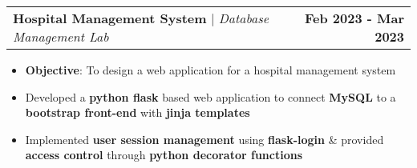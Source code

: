 \documentclass[letterpaper,9pt]{article}
\makeatletter
\newcommand{\resumeItem}[1]{
  \item\small{
    {#1 \vspace{-2pt}}
  }
}
\newcommand{\resumeItemNoBullet}[1]{
  \item[]\small{
    {#1 \vspace{-2pt}}
  }
}
\newcommand{\resumeProjectHeading}[2]{
    \item
    \begin{tabular*}{1.001\textwidth}{l@{\extracolsep{\fill}}r}
      \small#1 & \textbf{\small #2}\\
    \end{tabular*}\vspace{-7pt}
}
\newcommand{\resumeItemListStart}{\begin{itemize}}
\newcommand{\resumeItemListEnd}{\end{itemize}\vspace{-5pt}}
\makeatother
\begin{document}
      \resumeProjectHeading
        {\textbf{Hospital Management System} $|$ \emph{Database Management Lab}}{Feb 2023 - Mar 2023}
        \resumeItemListStart
          \resumeItemNoBullet{\textbf{Objective}: To design a web application for a hospital management system}
          \resumeItem{Developed a \textbf{python flask} based web application to connect \textbf{MySQL} to a \textbf{bootstrap front-end} with \textbf{jinja templates}}
          \resumeItem{Implemented \textbf{user session management} using \textbf{flask-login} \& provided \textbf{access control} through \textbf{python decorator functions}}
        \resumeItemListEnd 



\end{document}
